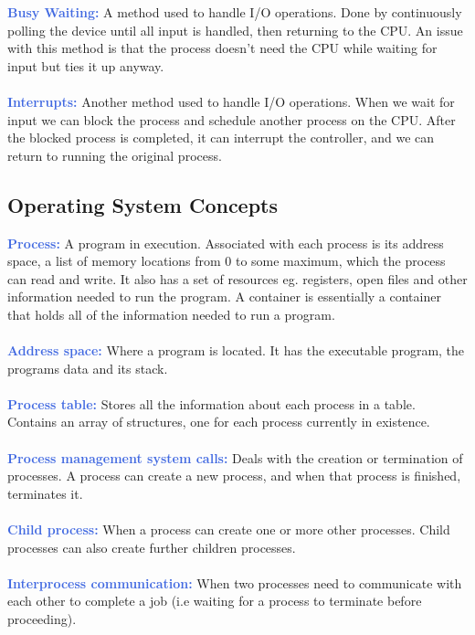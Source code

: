 \documentclass[a4paper,10pt]{article}
\begin{document}
\textcolor{RoyalBlue}{\textbf{Busy Waiting:}} A method used to handle I/O operations. Done by continuously polling the device until all input is handled, then returning to the CPU. An issue with this method is that the process doesn't need the CPU while waiting for input but ties it up anyway. \\\\ 
\textcolor{RoyalBlue}{\textbf{Interrupts:}} Another method used to handle I/O operations. When we wait for input we can block the process and schedule another process on the CPU. After the blocked process is completed, it can interrupt the controller, and we can return to running the original process. 
\subsection{Operating System Concepts}
\textcolor{RoyalBlue}{\textbf{Process:}} A program in execution. Associated with each process is its address space, a list of memory locations from 0 to some maximum, which the process can read and write. It also has a set of resources eg. registers, open files and other information needed to run the program. A container is essentially a container that holds all of the information needed to run a program. \\\\
\textcolor{RoyalBlue}{\textbf{Address space:}} Where a program is located. It has the executable program, the programs data and its stack. \\\\
\textcolor{RoyalBlue}{\textbf{Process table:}} Stores all the information about each process in a table. Contains an array of structures, one for each process currently in existence. \\\\
\textcolor{RoyalBlue}{\textbf{Process management system calls:}} Deals with the creation or termination of processes. A process can create a new process, and when that process is finished, terminates it. \\\\
\textcolor{RoyalBlue}{\textbf{Child process:}} When a process can create one or more other processes. Child processes can also create further children processes. \\\\
\textcolor{RoyalBlue}{\textbf{Interprocess communication:}} When two processes need to communicate with each other to complete a job (i.e waiting for a process to terminate before proceeding).
\end{document}
